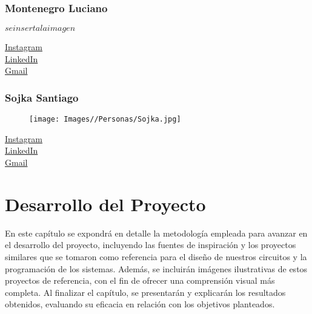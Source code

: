 \documentclass{article}
\begin{document}
\subsubsection{Montenegro Luciano}
\begin{minipage}[t]{0.3\textwidth}

    $se inserta la imagen$

\end{minipage}
\begin{minipage}[t]{0.5\textwidth}
    \vspace{3.5em}
    \href{https://instagram.com/luchito_.montenegro}{Instagram} \\[1em]
    \href{https://www.linkedin.com/in/luciano-montenegro-3215aa304}{LinkedIn} \\[1em]
    \href{mailto:lucianomontenegro1021@gmail.com}{Gmail}
\end{minipage}%

\subsubsection{Sojka Santiago}
\begin{minipage}[t]{0.3\textwidth}
\begin{figure}[H]
    \texttt{[image: Images//Personas/Sojka.jpg]}
\end{figure}
\end{minipage}
\begin{minipage}[t]{0.5\textwidth}
    \vspace{3.5em}
    \href{https://instagram.com/sojkaa.sant}{Instagram} \\[1em]
    \href{https://www.linkedin.com/in/santiago-sojka-817198271/}{LinkedIn} \\[1em]
    \href{mailto:santiagosojka@gmail.com}{Gmail}
\end{minipage}%


\section{Desarrollo del Proyecto}
En este capítulo se expondrá en detalle la metodología empleada para avanzar en el desarrollo del proyecto, incluyendo las fuentes de inspiración y los proyectos similares que se tomaron como referencia para el diseño de nuestros circuitos y la programación de los sistemas. Además, se incluirán imágenes ilustrativas de estos proyectos de referencia, con el fin de ofrecer una comprensión visual más completa. Al finalizar el capítulo, se presentarán y explicarán los resultados obtenidos, evaluando su eficacia en relación con los objetivos planteados.
\end{document}
